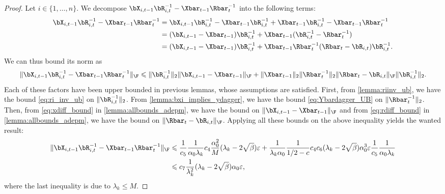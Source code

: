 \documentclass{article}
\theoremstyle{plain}
\theoremstyle{definition}
\theoremstyle{remark}
\begin{document}
\begin{proof}

  Let $i\in\{1,\dots,n\}$. We decompose $ \bX_{i,t-1}\bR_{i,t}^{-1} - \Xbar_{t-1}\Rbar_{t}^{-1} $ into the following terms:
  \begin{align*}
    \bX_{i,t-1}\bR_{i,t}^{-1} - \Xbar_{t-1}\Rbar_{t}^{-1} & =  \bX_{i,t-1}\bR_{i,t}^{-1} - \Xbar_{t-1}\bR_{i,t}^{-1} + \Xbar_{t-1}\bR_{i,t}^{-1} - \Xbar_{t-1}\Rbar_{t}^{-1} \\
    & = (\bX_{i,t-1} - \Xbar_{t-1})\bR_{i,t}^{-1} + \Xbar_{t-1}(\bR_{i,t}^{-1} - \Rbar_{t}^{-1})\\
    & = (\bX_{i,t-1} - \Xbar_{t-1})\bR_{i,t}^{-1} + \Xbar_{t-1}\Rbar_t^{-1}(\Rbar_t - \bR_{i,t})\bR_{i,t}^{-1}.
  \end{align*}
  We can thus bound its norm as 
  \begin{align*}
    \Vert \bX_{i,t-1}\bR_{i,t}^{-1} - \Xbar_{t-1}\Rbar_{t}^{-1} \Vert_\F \leqslant \Vert\bR_{i,t}^{-1}\Vert_2 \Vert \bX_{i,t-1} - \Xbar_{t-1} \Vert_\F + \Vert \Xbar_{t-1} \Vert_2 \Vert \Rbar_t^{-1} \Vert_2 \Vert \Rbar_t - \bR_{i,t} \Vert_\F \Vert \bR_{i,t}^{-1} \Vert_2.
  \end{align*}
  Each of these factors have been upper bounded in previous lemmas, whose assumptions are satisfied. First, from \cref{lemma:riinv_ub}, we have the bound \eqref{eq:ri_inv_ub} on $\Vert\bR_{i,t}^{-1}\Vert_2$. From \cref{lemma:bxi_implies_ydagger}, we have the bound \eqref{eq:Ybardagger_UB} on $\Vert \Rbar_t^{-1} \Vert_2$. Then, from \eqref{eq:xdiff_bound} in \cref{lemma:allbounds_adepm}, we have the bound on $\Vert \bX_{i,t-1} - \Xbar_{t-1} \Vert_\F$ and from \eqref{eq:rdiff_bound} in \cref{lemma:allbounds_adepm}, we have the bound on $\Vert \Rbar_t - \bR_{i,t} \Vert_\F$. Applying all these bounds on the above inequality yields the wanted result:
  \begin{align*}
    \Vert \bX_{i,t-1}\bR_{i,t}^{-1} - \Xbar_{t-1}\Rbar_{t}^{-1} \Vert_\F & \leqslant \frac{1}{c_5}\frac{1}{\alpha_0\lambda_k} c_4 \frac{\alpha_0^2}{M} (\lambda_k-2\sqrt{\beta})\varepsilon  +  \frac{1}{\lambda_k\alpha_0}\frac{1}{1/2 - c} c_4c_6 (\lambda_k-2\sqrt{\beta})\alpha_0^3 \varepsilon \frac{1}{c_5}\frac{1}{\alpha_0\lambda_k} \\
    & \leqslant c_7 \frac{1}{\lambda_k^2} (\lambda_k - 2\sqrt{\beta}) \alpha_0 \varepsilon,
  \end{align*}
  where the last inequality is due to $\lambda_k\leqslant M$.

\end{proof}
\end{document}
